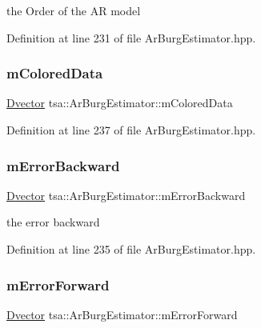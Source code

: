 the Order of the AR model 

Definition at line 231 of file Ar\+Burg\+Estimator.\+hpp.

\mbox{\label{classtsa_1_1_ar_burg_estimator_a7b50a6b230b2236500f54f9561d9ef7d}} 
\subsubsection{\texorpdfstring{m\+Colored\+Data}{mColoredData}}
{\footnotesize\ttfamily \hyperlink{namespacetsa_a8900fb03d849baf447a1a0efe2561fb2}{Dvector} tsa\+::\+Ar\+Burg\+Estimator\+::m\+Colored\+Data\hspace{0.3cm}{\ttfamily [private]}}



Definition at line 237 of file Ar\+Burg\+Estimator.\+hpp.

\mbox{\label{classtsa_1_1_ar_burg_estimator_abe77e4f47e6eb9e1f39e22f99331c981}} 
\subsubsection{\texorpdfstring{m\+Error\+Backward}{mErrorBackward}}
{\footnotesize\ttfamily \hyperlink{namespacetsa_a8900fb03d849baf447a1a0efe2561fb2}{Dvector} tsa\+::\+Ar\+Burg\+Estimator\+::m\+Error\+Backward\hspace{0.3cm}{\ttfamily [private]}}

the error backward 

Definition at line 235 of file Ar\+Burg\+Estimator.\+hpp.

\mbox{\label{classtsa_1_1_ar_burg_estimator_a3ff0b47d541f89567d177a42103a95a2}} 
\subsubsection{\texorpdfstring{m\+Error\+Forward}{mErrorForward}}
{\footnotesize\ttfamily \hyperlink{namespacetsa_a8900fb03d849baf447a1a0efe2561fb2}{Dvector} tsa\+::\+Ar\+Burg\+Estimator\+::m\+Error\+Forward\hspace{0.3cm}{\ttfamily [private]}}


